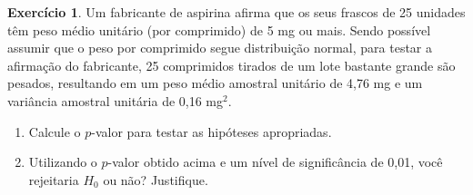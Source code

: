 \documentclass[]{article}
\theoremstyle{definition}
\newtheorem{ex}{Exercício}
\begin{document}
\begin{ex}
Um fabricante de aspirina afirma que os seus frascos de 25 unidades têm peso médio unitário (por comprimido) de 5 mg ou mais. Sendo possível assumir que o peso por comprimido segue distribuição normal, para testar a afirmação do fabricante, 25 comprimidos tirados de um lote bastante grande são pesados, resultando em um peso médio amostral unitário de 4,76 mg e um variância amostral unitária de 0,16 mg$^2$.
\begin{enumerate}
	\item Calcule o $p$-valor para testar as hipóteses apropriadas. %
	\item Utilizando o $p$-valor obtido acima e um nível de significância de 0,01, você rejeitaria $H_0$ ou não? Justifique. %
\end{enumerate}
\end{ex}
\end{document}
